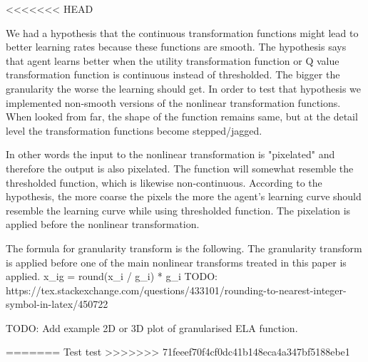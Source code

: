 
<<<<<<< HEAD

We had a hypothesis that the continuous transformation functions might lead to better learning rates because these functions are smooth. The hypothesis says that agent learns better when the utility transformation function or Q value transformation function is continuous instead of thresholded. The bigger the granularity the worse the learning should get. In order to test that hypothesis we implemented non-smooth versions of the nonlinear transformation functions. When looked from far, the shape of the function remains same, but at the detail level the transformation functions become stepped/jagged.

In other words the input to the nonlinear transformation is "pixelated" and therefore the output is also pixelated. The function will somewhat resemble the thresholded function, which is likewise non-continuous. According to the hypothesis, the more coarse the pixels the more the agent's learning curve should resemble the learning curve while using thresholded function. The pixelation is applied before the nonlinear transformation.

The formula for granularity transform is the following. The granularity transform is applied before one of the main nonlinear transforms treated in this paper is applied.
x_ig = round(x_i / g_i) * g_i
TODO: https://tex.stackexchange.com/questions/433101/rounding-to-nearest-integer-symbol-in-latex/450722

TODO: Add example 2D or 3D plot of granularised ELA function.



=======
Test test
>>>>>>> 71feeef70f4cf0dc41b148eca4a347bf5188ebe1

